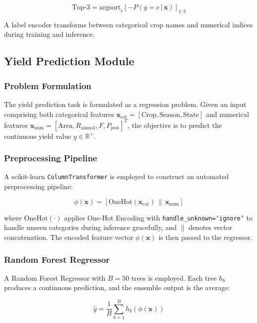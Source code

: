 \begin{equation}
\text{Top-3} = \text{argsort}_{c}[-P(y = c \,|\, \mathbf{x})]_{1:3}
\end{equation}

A label encoder transforms between categorical crop names and numerical indices during training and inference.

\subsection{Yield Prediction Module}

\subsubsection{Problem Formulation}
The yield prediction task is formulated as a regression problem. Given an input comprising both categorical features $\mathbf{x}_{\text{cat}} = [\text{Crop}, \text{Season}, \text{State}]$ and numerical features $\mathbf{x}_{\text{num}} = [\text{Area}, R_{\text{annual}}, F, P_{\text{pest}}]^T$, the objective is to predict the continuous yield value $y \in \mathbb{R}^+$.

\subsubsection{Preprocessing Pipeline}
A scikit-learn \texttt{ColumnTransformer} is employed to construct an automated preprocessing pipeline:

\begin{equation}
\phi(\mathbf{x}) = [\text{OneHot}(\mathbf{x}_{\text{cat}}) \,\|\, \mathbf{x}_{\text{num}}]
\end{equation}

where $\text{OneHot}(\cdot)$ applies One-Hot Encoding with \texttt{handle\_unknown=`ignore'} to handle unseen categories during inference gracefully, and $\|$ denotes vector concatenation. The encoded feature vector $\phi(\mathbf{x})$ is then passed to the regressor.

\subsubsection{Random Forest Regressor}
A Random Forest Regressor with $B = 50$ trees is employed. Each tree $h_b$ produces a continuous prediction, and the ensemble output is the average:

\begin{equation}
\hat{y} = \frac{1}{B} \sum_{b=1}^{B} h_b(\phi(\mathbf{x}))
\label{eq:rf_regression}
\end{equation}

